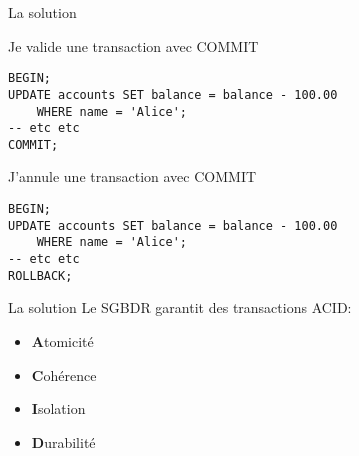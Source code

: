 \documentclass[xetex,dvipsnames]{beamer}
\begin{document}
\begin{frame}[fragile]{La solution}
\begin{block}{Je valide une transaction avec COMMIT}
	\begin{verbatim}
BEGIN;
UPDATE accounts SET balance = balance - 100.00
    WHERE name = 'Alice';
-- etc etc
COMMIT; 
    \end{verbatim}
\end{block}
\begin{alertblock}{J'annule une transaction avec COMMIT}
	\begin{verbatim}
BEGIN;
UPDATE accounts SET balance = balance - 100.00
    WHERE name = 'Alice';
-- etc etc
ROLLBACK; 
    \end{verbatim}    
\end{alertblock}    
    
\end{frame}

\begin{frame}[fragile]{La solution}
    Le SGBDR garantit des transactions ACID:
	\begin{itemize}
		\item \textbf{A}tomicité
		\item \textbf{C}ohérence
		\item \textbf{I}solation
		\item \textbf{D}urabilité
	\end{itemize}
    
\end{frame}
\end{document}
